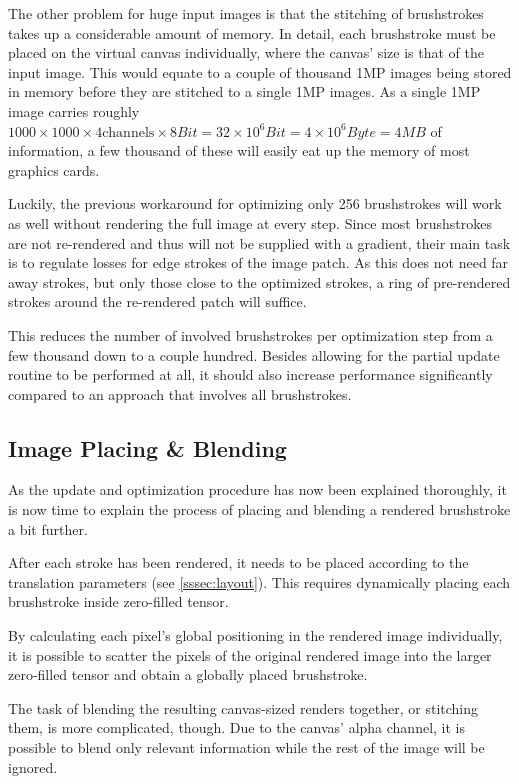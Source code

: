 The other problem for huge input images is that the stitching of brushstrokes takes up a considerable amount of memory.
In detail, each brushstroke must be placed on the virtual canvas individually,  where the canvas' size is that of the input image.
This would equate to a couple of thousand 1MP images being stored in memory before they are stitched to a single 1MP images.
As a single 1MP image carries roughly $1000 \times 1000 \times 4 \text{channels} \times 8 Bit = 32 \times 10^{6} Bit = 4 \times 10^{6} Byte = 4 MB$ of information, a few thousand of these will easily eat up the memory of most graphics cards.

Luckily, the previous workaround for optimizing only 256 brushstrokes will work as well without rendering the full image at every step.
Since most brushstrokes are not re-rendered and thus will not be supplied with a gradient, their main task is to regulate losses for edge strokes of the image patch.
As this does not need far away strokes, but only those close to the optimized strokes, a ring of pre-rendered strokes around the re-rendered patch will suffice.

This reduces the number of involved brushstrokes per optimization step from a few thousand down to a couple hundred.
Besides allowing for the partial update routine to be performed at all, it should also increase performance significantly compared to an approach that involves all brushstrokes.

\subsection{Image Placing \& Blending}
As the update and optimization procedure has now been explained thoroughly, it is now time to explain the process of placing and blending a rendered brushstroke a bit further.

After each stroke has been rendered, it needs to be placed according to the translation parameters (see \ref{sssec:layout}).
This requires dynamically placing each brushstroke inside zero-filled tensor.

By calculating each pixel's global positioning in the rendered image individually, it is possible to scatter the pixels of the original rendered image into the larger zero-filled tensor and obtain a globally placed brushstroke.

The task of blending the resulting canvas-sized renders together, or stitching them, is more complicated, though.
Due to the canvas' alpha channel, it is possible to blend only relevant information while the rest of the image will be ignored.

